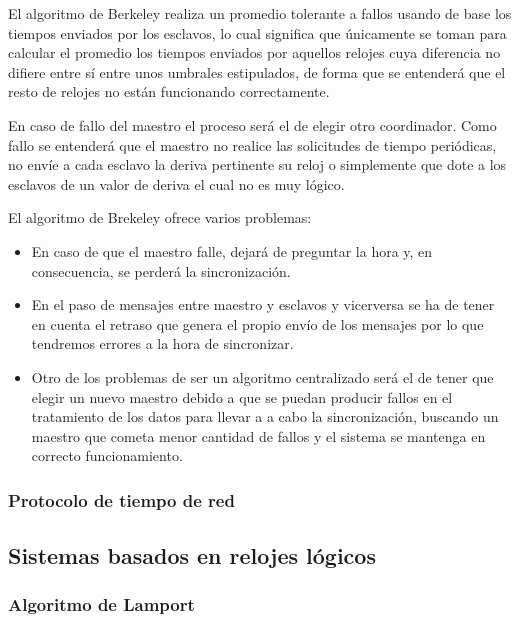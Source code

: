 \documentclass[a4paper, 11pt, titlepage]{article}
\begin{document}
            El algoritmo de Berkeley realiza un promedio tolerante a fallos usando de base los tiempos 
            enviados por los esclavos, lo cual significa que únicamente se toman para calcular el promedio 
            los tiempos enviados por aquellos relojes cuya diferencia no difiere entre sí entre unos 
            umbrales estipulados, de forma que se entenderá que el resto de relojes no están funcionando 
            correctamente.

            En caso de fallo del maestro el proceso será el de elegir otro coordinador. Como fallo se 
            entenderá que el maestro no realice las solicitudes de tiempo periódicas, no envíe a cada 
            esclavo la deriva pertinente su reloj o simplemente que dote a los esclavos de un valor de 
            deriva el cual no es muy lógico. 

            El algoritmo de Brekeley ofrece varios problemas:

            \begin{itemize}
                \item En caso de que el maestro falle, dejará de preguntar la hora y, en consecuencia, 
                se perderá la sincronización.
                \item En el paso de mensajes entre maestro y esclavos y vicerversa se ha de tener en 
                cuenta el retraso que genera el propio envío de los mensajes por lo que tendremos errores 
                a la hora de sincronizar.
                \item Otro de los problemas de ser un algoritmo centralizado será el de tener que elegir 
                un nuevo maestro debido a que se puedan producir fallos en el tratamiento de los datos 
                para llevar a a cabo la sincronización, buscando un maestro que cometa menor cantidad de 
                fallos y el sistema se mantenga en correcto funcionamiento. 
            \end{itemize}

        \subsubsection{Protocolo de tiempo de red}

    \subsection{Sistemas basados en relojes lógicos}

        \subsubsection{Algoritmo de Lamport}
\end{document}
